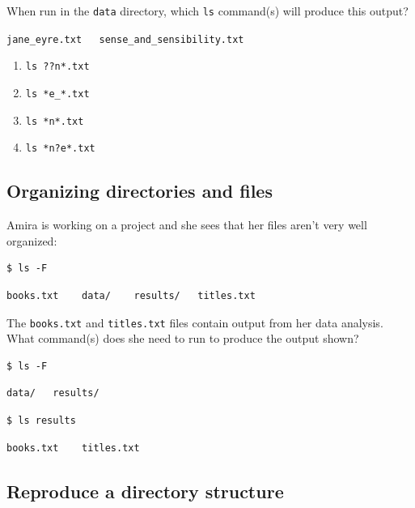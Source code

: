 \documentclass[
]{krantz}
\providecommand{\tightlist}{%
  \setlength{\itemsep}{0pt}\setlength{\parskip}{0pt}}
\begin{document}
When run in the \texttt{data} directory, which \texttt{ls} command(s) will
produce this output?

\texttt{jane\_eyre.txt\ \ \ sense\_and\_sensibility.txt}

\begin{enumerate}
\def\labelenumi{\arabic{enumi}.}
\tightlist
\item
  \texttt{ls\ ??n*.txt}
\item
  \texttt{ls\ *e\_*.txt}
\item
  \texttt{ls\ *n*.txt}
\item
  \texttt{ls\ *n?e*.txt}
\end{enumerate}

\hypertarget{bash-basics-ex-organizing}{%
\subsection{Organizing directories and files}\label{bash-basics-ex-organizing}}

Amira is working on a project and she sees that her files aren't very well
organized:

\begin{verbatim}
$ ls -F
\end{verbatim}

\begin{verbatim}
books.txt    data/    results/   titles.txt
\end{verbatim}

The \texttt{books.txt} and \texttt{titles.txt} files contain output from her data
analysis. What command(s) does she need to run
to produce the output shown?

\begin{verbatim}
$ ls -F
\end{verbatim}

\begin{verbatim}
data/   results/
\end{verbatim}

\begin{verbatim}
$ ls results
\end{verbatim}

\begin{verbatim}
books.txt    titles.txt
\end{verbatim}

\hypertarget{bash-basics-ex-reproduce-structure}{%
\subsection{Reproduce a directory structure}\label{bash-basics-ex-reproduce-structure}}
\end{document}
